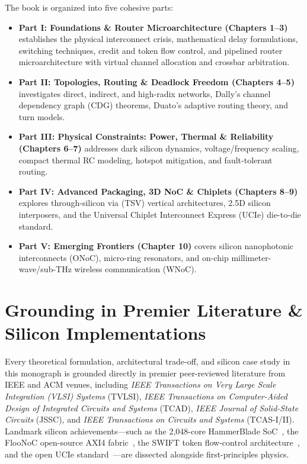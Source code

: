 The book is organized into five cohesive parts:
\begin{itemize}
    \item \textbf{Part I: Foundations \& Router Microarchitecture (Chapters 1--3)} establishes the physical interconnect crisis, mathematical delay formulations, switching techniques, credit and token flow control, and pipelined router microarchitecture with virtual channel allocation and crossbar arbitration.
    \item \textbf{Part II: Topologies, Routing \& Deadlock Freedom (Chapters 4--5)} investigates direct, indirect, and high-radix networks, Dally's channel dependency graph (CDG) theorems, Duato's adaptive routing theory, and turn models.
    \item \textbf{Part III: Physical Constraints: Power, Thermal \& Reliability (Chapters 6--7)} addresses dark silicon dynamics, voltage/frequency scaling, compact thermal RC modeling, hotspot mitigation, and fault-tolerant routing.
    \item \textbf{Part IV: Advanced Packaging, 3D NoC \& Chiplets (Chapters 8--9)} explores through-silicon via (TSV) vertical architectures, 2.5D silicon interposers, and the Universal Chiplet Interconnect Express (UCIe) die-to-die standard.
    \item \textbf{Part V: Emerging Frontiers (Chapter 10)} covers silicon nanophotonic interconnects (ONoC), micro-ring resonators, and on-chip millimeter-wave/sub-THz wireless communication (WNoC).
\end{itemize}

\section*{Grounding in Premier Literature \& Silicon Implementations}
Every theoretical formulation, architectural trade-off, and silicon case study in this monograph is grounded directly in premier peer-reviewed literature from IEEE and ACM venues, including \emph{IEEE Transactions on Very Large Scale Integration (VLSI) Systems} (TVLSI), \emph{IEEE Transactions on Computer-Aided Design of Integrated Circuits and Systems} (TCAD), \emph{IEEE Journal of Solid-State Circuits} (JSSC), and \emph{IEEE Transactions on Circuits and Systems} (TCAS-I/II). Landmark silicon achievements---such as the 2,048-core HammerBlade SoC~\cite{Gao2026}, the FlooNoC open-source AXI4 fabric~\cite{Fischer2025}, the SWIFT token flow-control architecture~\cite{Davidson2023}, and the open UCIe standard~\cite{UCIe2023}---are dissected alongside first-principles physics.

